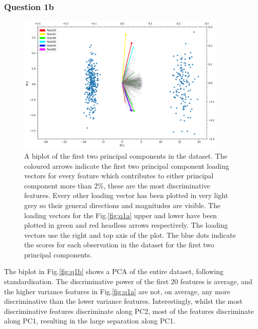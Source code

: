 \subsubsection{Question 1b}\label{subsubsec:q1b}

    \begin{figure}[htb]
    \centering
    \includegraphics[width=0.9\textwidth]{./figures/q1b}
    \caption{A biplot of the first two principal components in the  dataset.
        The coloured arrows indicate the first two principal component loading vectors for every feature which contributes to
        either principal component more than 2\%, these are the most discriminative features.
        Every other loading vector has been plotted in very light grey so their general directions and magnitudes are
        visible.
        The loading vectors for the Fig.\eqref{fig:q1a} upper and lower have been plotted in green and red headless
        arrows respectively.
        The loading vectors use the right and top axis of the plot.
        The blue dots indicate the scores for each observation in the dataset for the first two principal components.}
    \label{fig:q1b}
    \end{figure}

    The biplot in Fig.\eqref{fig:q1b} shows a PCA of the entire dataset, following standardisation.
    The discriminative power of the first 20 features is average, and the higher variance features in Fig.\eqref{fig:q1a}
    are not, on average, any more discriminative than the lower variance features.
    Interestingly, whilst the most discriminative features discriminate along PC2, most of the features discriminate
    along PC1, resulting in the large separation along PC1.

